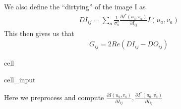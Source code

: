 \documentclass[letterpaper,10pt,english]{jupyterBook}
\begin{document}
\sphinxAtStartPar
We also define the “dirtying” of the image I as
\begin{equation*}
\begin{split}DI_{ij} = \sum_a \frac{1}{\sigma^2_a}\frac{\partial I^*(u_a,v_a)}{\partial I_{ij}}I(u_a,v_a)\end{split}
\end{equation*}
\sphinxAtStartPar
This then gives us that
\begin{equation*}
\begin{split}G_{ij} = 2Re(DI_{ij}-DO_{ij})\end{split}
\end{equation*}
\begin{sphinxuseclass}{cell}\begin{sphinxVerbatimInput}

\begin{sphinxuseclass}{cell_input}
\begin{sphinxVerbatim}[commandchars=\\\{\}]
   
   
  
\end{sphinxVerbatim}

\end{sphinxuseclass}\end{sphinxVerbatimInput}

\end{sphinxuseclass}
\sphinxAtStartPar
Here we preprocess and compute \(\frac{\partial I(u_a,v_a)}{\partial I_{ij}}, \frac{\partial I^*(u_a,v_a)}{\partial I_{ij}}\)
\end{document}
